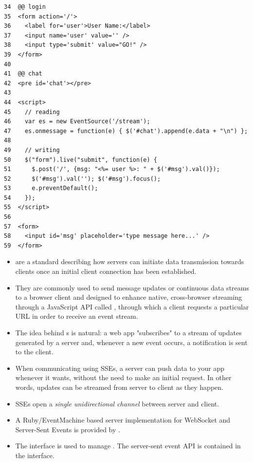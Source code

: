 \begin{verbatim}
34  @@ login
35  <form action='/'>
36    <label for='user'>User Name:</label>
37    <input name='user' value='' />
38    <input type='submit' value="GO!" />
39  </form>
40  
41  @@ chat
42  <pre id='chat'></pre>
43  
44  <script>
45    // reading
46    var es = new EventSource('/stream');
47    es.onmessage = function(e) { $('#chat').append(e.data + "\n") };
48  
49    // writing
50    $("form").live("submit", function(e) {
51      $.post('/', {msg: "<%= user %>: " + $('#msg').val()});
52      $('#msg').val(''); $('#msg').focus();
53      e.preventDefault();
54    });
55  </script>
56  
57  <form>
58    <input id='msg' placeholder='type message here...' />
59  </form>
\end{verbatim}
\begin{itemize}
\item
{} are a standard describing how servers can
initiate data transmission towards clients once an initial client
connection has been established. 
\item
They are commonly used to send
message updates or continuous data streams to a browser client and
designed to enhance native, cross-browser streaming through a
JavaScript API called , 
through which a client requests
a particular URL in order to receive an event stream.
\item
The idea behind s is natural: a web app "subscribes" to a
stream of updates generated by a server and, whenever a new event
occurs, a notification is sent to the client. 
\item
When communicating using SSEs, a server can push data to your app
whenever it wants, without the need to make an initial request. In
other words, updates can be streamed from server to client as they
happen. 
\item
SSEs open a \emph{single unidirectional channel} between server
and client.
\item
A Ruby/EventMachine based server implementation for WebSocket and Server-Sent Events is
provided by .
\item
The  interface is used to manage . 
The server-sent event API is contained in the
interface.
\end{itemize}

